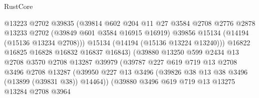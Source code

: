 \begin{lexlean}{RustCore}
\begin{coremodule}
                                    @13223
                                    @2702
                                    @39835
                                    (@39814
                                      @602
                                      @204
                                      @11
                                      @27
                                      @3584
                                      @2708
                                      @2776
                                      @2878
                                      @13233
                                      @2702
                                      (@39849 @601 @3584 @16915 @16919)
                                      @39856
                                      @15134
                                      (@14194 (@15136 @13234 @2708)))
                                    @15134
                                    (@14194 (@15136 @13224 @13240)))
                                  @16822
                                  @16825
                                  @16828
                                  @16832
                                  @16837
                                  @16843)
                                (@39880
                                  @13250
                                  @599
                                  @2434
                                  @13
                                  @2708
                                  @3570
                                  @2708
                                  @13287
                                  @39979
                                  (@39787
                                    @227
                                    @619
                                    @719
                                    @13
                                    @2708
                                    @3496
                                    @2708
                                    @13287
                                    (@39950
                                      @227
                                      @13
                                      @3496
                                      (@39826 @38 @13 @38 @3496 (@13899 (@39831 @38)) @14464))
                                    (@39880
                                      @3496
                                      @619
                                      @719
                                      @13
                                      @13275
                                      @13284
                                      @2708
                                      @3964

\end{coremodule}
\end{lexlean}
